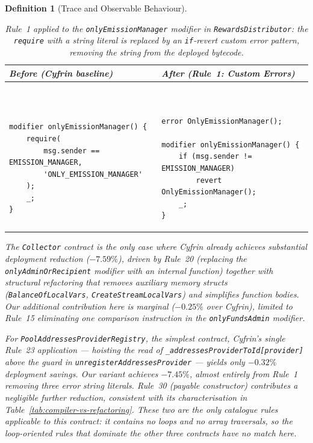 \documentclass[manuscript,screen,review]{acmart}
\newtheorem{definition}{Definition}
\begin{document}
\begin{definition}[Trace and Observable Behaviour]
\begin{table}[htb]
\caption{Rule~1 applied to the \texttt{onlyEmissionManager} modifier in
  \texttt{RewardsDistributor}: the \texttt{require} with a string literal is
  replaced by an \texttt{if}-revert custom error pattern, removing the string
  from the deployed bytecode.}
\label{tab:rule1_example}
\centering
\begin{footnotesize}
\begin{tabular}{|p{}|p{}|}
\hline
\rowcolor[HTML]{EFEFEF}
\textbf{Before (Cyfrin baseline)} & \textbf{After (Rule~1: Custom Errors)} \\ \hline
\vspace{-0.4cm}
\begin{verbatim}


modifier onlyEmissionManager() {
    require(
        msg.sender == EMISSION_MANAGER,
        'ONLY_EMISSION_MANAGER'
    );
    _;
}
\end{verbatim}
&
\vspace{-0.4cm}
\begin{verbatim}


error OnlyEmissionManager();

modifier onlyEmissionManager() {
    if (msg.sender != EMISSION_MANAGER)
        revert OnlyEmissionManager();
    _;
}
\end{verbatim}
\\ \hline
\end{tabular}
\end{footnotesize}
\end{table}

The \texttt{Collector} contract is the only case where Cyfrin already
achieves substantial deployment reduction ($-7.59\%$), driven by Rule~20
(replacing the \texttt{onlyAdminOrRecipient} modifier with an internal
function) together with structural refactoring that removes auxiliary memory
structs (\texttt{BalanceOfLocalVars}, \texttt{CreateStreamLocalVars}) and
simplifies function bodies. Our additional contribution here is marginal
($-0.25\%$ over Cyfrin), limited to Rule~15 eliminating one comparison
instruction in the \texttt{onlyFundsAdmin} modifier.

For \texttt{PoolAddressesProviderRegistry}, the simplest contract, Cyfrin's
single Rule~23 application --- hoisting the read of
\texttt{\_addressesProviderToId[provider]} above the guard in
\texttt{unregisterAddressesProvider} --- yields only $-0.32\%$ deployment
savings. Our variant achieves $-7.45\%$, almost entirely from Rule~1
removing three error string literals. Rule~30 (payable constructor)
contributes a negligible further reduction, consistent with its
characterisation in Table~\ref{tab:compiler-vs-refactoring}. These two are
the only catalogue rules applicable to this contract: it contains no loops
and no array traversals, so the loop-oriented rules that dominate the other
three contracts have no match here.


\end{definition}
\end{document}
